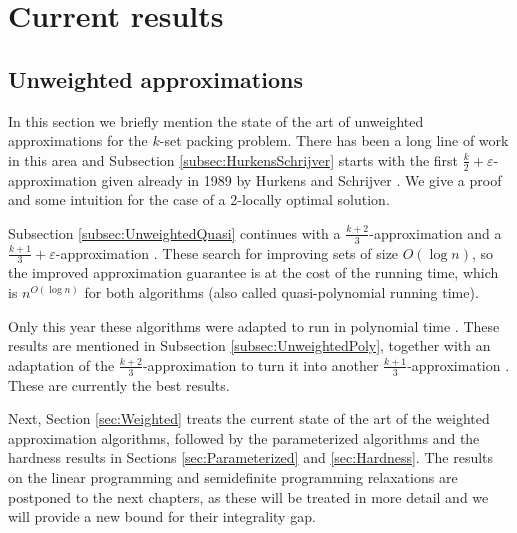 \chapter{Current results}\label{chap:Results}

\section{Unweighted approximations}\label{sec:Unweighted}

In this section we briefly mention the state of the art of unweighted approximations for the $k$-set packing problem. There has been a long line of work in this area and Subsection \ref{subsec:HurkensSchrijver} starts with the first $\frac{k}{2} + \varepsilon$-approximation given already in 1989 by Hurkens and Schrijver \cite{HurkensSchrijver}. We give a proof and some intuition for the case of a 2-locally optimal solution.

Subsection \ref{subsec:UnweightedQuasi} continues with a $\frac{k+2}{3}$-approximation \cite{Halldorsson} and a $\frac{k+1}{3} + \varepsilon$-approximation \cite{Mastrolilli}. These search for improving sets of size $O(\log n)$, so the improved approximation guarantee is at the cost of the running time, which is $n^{O(\log n)}$ for both algorithms (also called quasi-polynomial running time).


Only this year these algorithms were adapted to run in polynomial time \cite{Cygan,Sviridenko}. These results are mentioned in Subsection \ref{subsec:UnweightedPoly}, together with an adaptation of the $\frac{k+2}{3}$-approximation to turn it into another $\frac{k+1}{3}$-approximation \cite{FurerYu}. These are currently the best results.

Next, Section \ref{sec:Weighted} treats the current state of the art of the weighted approximation algorithms, followed by the parameterized algorithms and the hardness results in Sections \ref{sec:Parameterized} and \ref{sec:Hardness}. The results on the linear programming and semidefinite programming relaxations are postponed to the next chapters, as these will be treated in more detail and we will provide a new bound for their integrality gap.


